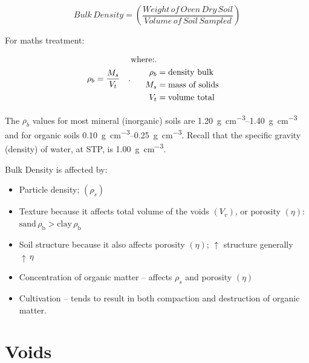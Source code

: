 \documentclass[letterpaper, 12pt]{article}
\begin{document}
\begin{equation}
    Bulk\,Density = \left(\frac{Weight\,of\,Oven\,Dry\,Soil}{Volume\,of\,Soil\,Sampled}\right)
\end{equation}

For maths treatment:

\begin{equation}
    \rho_b = \frac{M_s}{V_t}\quad.    \\
    \begin{aligned}
    \text{where:}.                    \\
        \rho_b &= \text{density bulk} \\
        M_s &= \text{mass of solids}  \\
        V_t &= \text{volume total}    \\
    \end{aligned}
\end{equation}

The $\rho_b$ values for most mineral (inorganic) soils are \qtyrange[range-units=single]{1.20}{1.40}{\gram\per\cubic\cm} and for organic soils \qtyrange[range-units=single]{0.10}{0.25}{\gram\per\cubic\centi\meter}. Recall that the specific gravity (density) of water, at STP, is \qty[per-mode=fraction]{1.00}{\gram\per\cubic\centi\meter}.

Bulk Density is affected by:
\begin{itemize}
    \item Particle density; $\left(\rho_s\right)$
    \item Texture because it affects total volume of the voids $\left(V_v\right)$, or porosity $\left(\eta\right)$:  $\text{sand}\,\rho_{\text{b}} > \text{clay}\,\rho_{\text{b}}$
    \item Soil structure because it also affects porosity $\left(\eta\right)$; $\uparrow$  structure generally $\uparrow\,\eta$
    \item Concentration of organic matter – affects $\rho_s$ and porosity $\left(\eta\right)$
    \item Cultivation – tends to result in both compaction and destruction of organic matter.
\end{itemize}

\section{Voids}
\label{voids}
\end{document}
